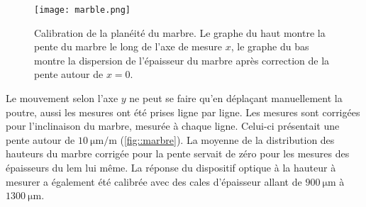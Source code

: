           \begin{figure}[htpb]
            \centering
            \texttt{[image: marble.png]}
            \caption[Calibration du système de mesure CCI]{\label{fig::marbre}Calibration de la planéité du marbre. Le graphe du haut montre la pente du marbre le long de l'axe de mesure $x$, le graphe du bas montre la dispersion de l'épaisseur du marbre après correction de la pente autour de $x=0$.}
          \end{figure}
          Le mouvement selon l'axe $y$ ne peut se faire qu'en déplaçant manuellement la poutre, aussi les mesures ont été prises ligne par ligne. Les mesures sont corrigées pour l'inclinaison du marbre, mesurée à chaque ligne. Celui-ci présentait une pente autour de $\SI{10}{\micro\meter\per\meter}$ (\autoref{fig::marbre}). La moyenne de la distribution des hauteurs du marbre corrigée pour la pente servait de zéro pour les mesures des épaisseurs du \gls{lem} lui même. La réponse du dispositif optique à la hauteur à mesurer a également été calibrée avec des cales d'épaisseur allant de $\SI{900}{\micro\meter}$ à $\SI{1300}{\micro\meter}$.
          
